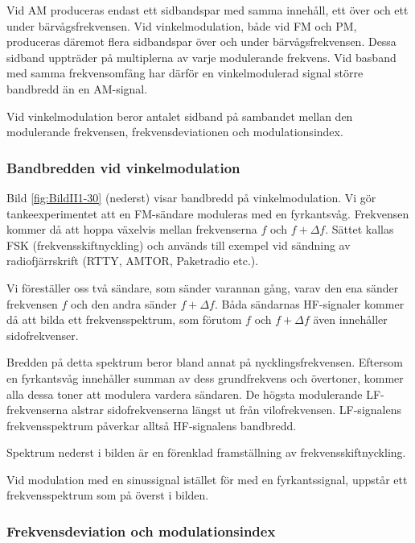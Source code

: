 Vid AM produceras endast ett sidbandspar med samma innehåll, ett över och ett
under bärvågsfrekvensen.
Vid vinkelmodulation, både vid FM och PM, produceras däremot flera sidbandspar
över och under bärvågsfrekvensen.
Dessa sidband uppträder på multiplerna av varje modulerande frekvens.
Vid basband med samma frekvensomfång har därför en vinkelmodulerad signal
större bandbredd än en AM-signal.

Vid vinkelmodulation beror antalet sidband på sambandet mellan den modulerande
frekvensen, frekvensdeviationen och modulationsindex.

\subsubsection{Bandbredden vid vinkelmodulation}

Bild \ref{fig:BildII1-30} (nederst) visar bandbredd på vinkelmodulation.
Vi gör tankeexperimentet att en FM-sändare moduleras med en fyrkantsvåg.
Frekvensen kommer då att hoppa växelvis mellan frekvenserna \(f\) och
\(f + \Delta f\).
Sättet kallas FSK (frekvensskiftnyckling) och används till exempel vid sändning av
radiofjärrskrift (RTTY, AMTOR, Paketradio etc.).

Vi föreställer oss två sändare, som sänder varannan gång, varav den ena sänder
frekvensen \(f\) och den andra sänder \(f + \Delta f\).
Båda sändarnas HF-signaler kommer då att bilda ett frekvensspektrum, som
förutom \(f\) och \(f + \Delta f\) även innehåller sidofrekvenser.

Bredden på detta spektrum beror bland annat på nycklingsfrekvensen.
Eftersom en fyrkantsvåg innehåller summan av dess grundfrekvens och övertoner,
kommer alla dessa toner att modulera vardera sändaren.
De högsta modulerande LF-frekvenserna alstrar sidofrekvenserna längst ut från
vilofrekvensen.
LF-signalens frekvensspektrum påverkar alltså HF-signalens bandbredd.

Spektrum nederst i bilden är en förenklad framställning av
frekvensskiftnyckling.

Vid modulation med en sinussignal istället för med en fyrkantssignal, uppstår
ett frekvensspektrum som på överst i bilden.

\subsubsection{Frekvensdeviation och modulationsindex}


